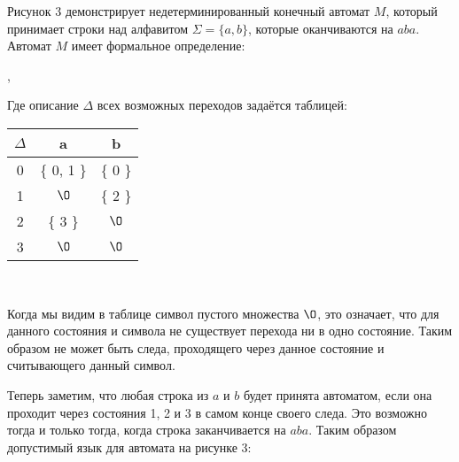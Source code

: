 

Рисунок 3 демонстрирует недетерминированный конечный автомат $M$, который принимает строки над алфавитом $\Sigma=\{ a, b \}$, которые оканчиваются на $aba$. Автомат $M$ имеет формальное определение:

, 

Где описание $\Delta$ всех возможных переходов задаётся таблицей:

\begin{center}
\begin{tabular}{c | c c}
$\Delta$ & a & b \\
\hline
0 & \{ 0, 1 \} & \{ 0 \} \\
1 & $\O$ & \{ 2 \} \\
2 & \{ 3 \} & $\O$ \\
3 & $\O$ & $\O$ \\
\end{tabular}
\end{center}
\

Когда мы видим в таблице символ пустого множества $\O$, это означает, что для данного состояния и символа не существует перехода ни в одно состояние. Таким образом не может быть следа, проходящего через данное состояние и считывающего данный символ. 

Теперь заметим, что любая строка из $a$ и $b$ будет принята автоматом, если она проходит через состояния 1, 2 и 3 в самом конце своего следа. Это возможно тогда и только тогда, когда строка заканчивается на $aba$. Таким образом допустимый язык для автомата на рисунке 3:








